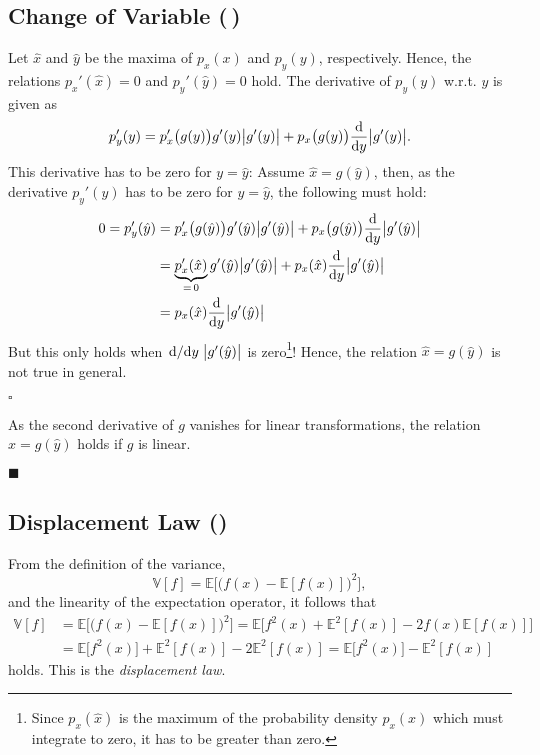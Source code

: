 \documentclass[11pt, a4paper]{scrartcl}
\newcommand{\E}{\mathbb{E}}
\newcommand{\Var}{\mathbb{V}}
\newcommand{\qed}{\hfill\(\square\)}
\newcommand{\eot}{\hfill\(\blacksquare\)}
\newcommand{\diffstar}{\texorpdfstring{\raisebox{-1pt}{\resizebox{!}{8pt}{\(\star\)}}}{*}}
\newcommand{\onestar}  {(\diffstar)}
\newcommand{\twostar}  {(\diffstar\,\diffstar)}
\begin{document}
		\subsection{Change of Variable  \twostar}
			Let \(\hat{x}\) and \(\hat{y}\) be the maxima of \(p_x(x)\) and \(p_y(y)\), respectively. Hence, the relations \( p_x'(\hat{x}) = 0 \) and \( p_y'(\hat{y}) = 0 \) hold. The derivative of \(p_y(y)\) w.r.t. \(y\) is given as
			\begin{equation}
				p_y'(y)
					= p_x'\big( g(y) \big) g'(y) \big\lvert g'(y) \big\rvert + p_x\big( g(y) \big) \dv{y} \big\lvert g'(y) \big\rvert.
			\end{equation}
			This derivative has to be zero for \(y = \hat{y}\):
			Assume \( \hat{x} = g(\hat{y}) \), then, as the derivative \( p_y'(y) \) has to be zero for \(y = \hat{y}\), the following must hold:
			\begin{align}
				0
					 = p_y'(\hat{y})
					&= p_x'\big( g(\hat{y}) \big) g'(\hat{y}) \big\lvert g'(\hat{y}) \big\rvert + p_x\big( g(\hat{y}) \big) \dv{y} \big\lvert g'(\hat{y}) \big\rvert \\
					&= \underbrace{p_x'(\hat{x})}_{=\, 0} g'(\hat{y}) \big\lvert g'(\hat{y}) \big\rvert + p_x(\hat{x}) \dv{y} \big\lvert g'(\hat{y}) \big\rvert \\
					&= p_x(\hat{x}) \dv{y} \big\lvert g'(\hat{y}) \big\rvert
			\end{align}
			But this only holds when \( \dv*{y} \big\lvert g'(\hat{y}) \big\rvert \) is zero\footnote{Since \(p_x(\hat{x})\) is the maximum of the probability density \(p_x(x)\) which must integrate to zero, it has to be greater than zero.}! Hence, the relation \( \hat{x} = g(\hat{y}) \) is not true in general.

			\qed

			As the second derivative of \(g\) vanishes for linear transformations, the relation \( \hat{x} = g(\hat{y}) \) holds if \(g\) is linear.

			\eot

		\subsection{Displacement Law  \onestar}
			From the definition of the variance,
			\begin{equation}
				\Var[f] = \E\Big[ \big( f(x) - \E[ f(x) ] \big)^2 \Big],
			\end{equation}
			and the linearity of the expectation operator, it follows that
			\begin{align}
				\Var[f]
					&= \E\Big[ \big( f(x) - \E[f(x)] \big)^2 \Big]
					 = \E\Big[ f^2(x) + \E^2[f(x)] - 2 f(x) \E[f(x)] \Big] \\
					&= \E\big[ f^2(x) \big] + \E^2[f(x)] - 2 \E^2[f(x)]
					 = \E\big[ f^2(x) \big] - \E^2[f(x)]
			\end{align}
			holds. This is the \emph{displacement law}.
\end{document}
